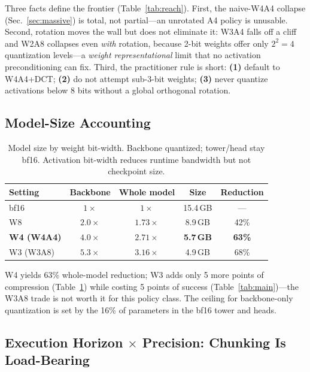 \documentclass[conference]{IEEEtran}
\begin{document}
Three facts define the frontier (Table~\ref{tab:reach}). First, the naive-W4A4 collapse
(Sec.~\ref{sec:massive}) is total, not partial---an unrotated A4 policy is unusable.
Second, rotation moves the wall but does not eliminate it: W3A4 falls off a cliff and
W2A8 collapses even \emph{with} rotation, because 2-bit weights offer only $2^2=4$
quantization levels---a \emph{weight representational} limit that no activation
preconditioning can fix. Third, the practitioner rule is short: \textbf{(1)} default to
W4A4+DCT; \textbf{(2)} do not attempt sub-3-bit weights; \textbf{(3)} never quantize
activations below 8 bits without a global orthogonal rotation.

\subsection{Model-Size Accounting}
\label{sec:size}

\begin{table}[h]\centering\small
\caption{Model size by weight bit-width. Backbone quantized; tower/head stay bf16.
Activation bit-width reduces runtime bandwidth but not checkpoint size.}
\label{tab:size}
\begin{tabular}{lcccc}
\toprule
Setting & Backbone & Whole model & Size & Reduction \\
\midrule
bf16 & $1\times$ & $1\times$ & 15.4\,GB & --- \\
W8   & $2.0\times$ & $1.73\times$ & 8.9\,GB & 42\% \\
\textbf{W4 (W4A4)} & $\mathbf{4.0\times}$ & $\mathbf{2.71\times}$ & \textbf{5.7\,GB} & \textbf{63\%} \\
W3 (W3A8) & $5.3\times$ & $3.16\times$ & 4.9\,GB & 68\% \\
\bottomrule
\end{tabular}
\end{table}

W4 yields 63\% whole-model reduction; W3 adds only 5 more points of compression
(Table~\ref{tab:size}) while costing 5 points of success (Table~\ref{tab:main})---the
W3A8 trade is not worth it for this policy class. The ceiling for backbone-only
quantization is set by the 16\% of parameters in the bf16 tower and heads.

\subsection{Execution Horizon $\times$ Precision: Chunking Is Load-Bearing}
\label{sec:horizon}
\end{document}
